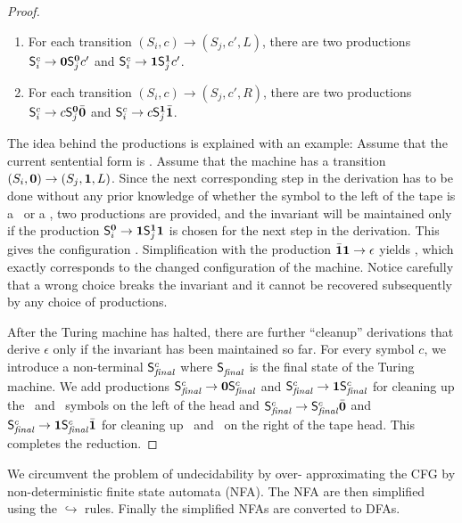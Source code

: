 \documentclass[9pt]{sigplanconf}
\begin{document}
{\begin{proof}
\begin{enumerate}
\item For each transition  $(S_i, c) \rightarrow (S_j,c',L)$, there are
  two  productions $\mathsf{S}_{i}^{c}  \rightarrow  \mathbf{0} \mathsf{S}_{j}^{\mathbf{0}}c'$
  and $\mathsf{S}_{i}^{c} \rightarrow \mathbf{1} \mathsf{S}_{j}^{\mathbf{1}}c'$.
\item For each  transition $(S_i, c) \rightarrow (S_j,c',R)$, there
  are two productions
  $\mathsf{S}_{i}^{c} \rightarrow c \mathsf{S}_{j}^{\mathbf{0}}\bar{\mathbf{0}}$ and $\mathsf{S}_{i}^{c}
  \rightarrow c \mathsf{S}_{j}^{\mathbf{1}}\bar{\mathbf{1}}$. 
\end{enumerate}
The idea behind  the productions is explained with  an example: Assume
that        the        current        sentential        form        is
\bcar\bcdr{}\acar\acar.  Assume that  the  machine has  a
transition  $(S_i,\mathbf{0}) \rightarrow (S_j,\mathbf{1},  L)$. Since  the next
corresponding step in the derivation  has to be done without any prior
knowledge of whether the symbol to the left of the tape is a \acar\ or
a  \acdr, two  productions are  provided,  and the  invariant will  be
maintained  only   if  the  production   $\mathsf{S}_{i}^{\mathbf{0}}  \rightarrow
\mathbf{1}\mathsf{S}_{j}^{\mathbf{1}}\mathbf{1}$  is  chosen  for   the  next  step  in  the
derivation.         This         gives        the        configuration
\bcar\bcdr\acdr{}\acdr\acar\acar.    Simplification  with
the    production    $\bar{\mathbf{1}}\mathbf{1}    \rightarrow    \epsilon$    yields
\bcar{}\acdr\acar\acar, which  exactly corresponds to the
changed configuration  of the machine.  Notice carefully that  a wrong
choice breaks the invariant and it cannot be recovered subsequently by
any choice of productions.

After  the Turing machine  has halted,  there are  further ``cleanup''
derivations  that derive  $\epsilon$ only  if the  invariant  has been
maintained  so far.  For every  symbol  $c$, we introduce  a  non-terminal
$\mathsf{S}_{\mathit{final}}^{c}$ where $\mathsf{S}_{\mathit{final}}^{}$ is the
final state of the Turing machine. We add
productions $\mathsf{S}_{\mathit{final}}^{c} \rightarrow \mathbf{0}
\mathsf{S}_{\mathit{final}}^{c}$ and $\mathsf{S}_{\mathit{final}}^{c} \rightarrow \mathbf{1}
\mathsf{S}_{\mathit{final}}^{c}$ for cleaning up the \bcar\ and \bcdr\ symbols on
the left of the head and $\mathsf{S}_{\mathit{final}}^{c} \rightarrow 
\mathsf{S}_{\mathit{final}}^{c}\bar{\mathbf{0}}$ and $\mathsf{S}_{\mathit{final}}^{c} \rightarrow \mathbf{1}
\mathsf{S}_{\mathit{final}}^{c}\bar{\mathbf{1}}$ for cleaning up \acar\ and \acdr\ on the
right of the tape head. This completes the reduction.  
\end{proof}
}%
We circumvent the problem  of undecidability by over- approximating the
CFG by non-deterministic finite state automata (NFA). The NFA are then
simplified using  the $\hookrightarrow$ rules.  Finally the simplified
NFAs are converted to DFAs.
\end{document}

